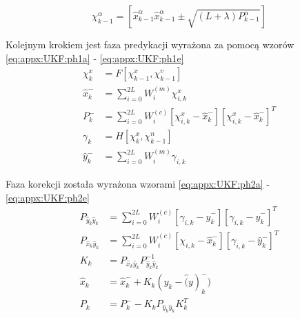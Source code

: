 \begin{equation}
	\chi^\alpha_{k-1} = [\widehat{x}^\alpha_{k-1} \widehat{x}^\alpha_{k-1}\pm\sqrt{(L+\lambda)P^\alpha_{k-1}}] \label{eq:appx:UKF:ph0}
\end{equation}
		
Kolejnym krokiem jest faza predykacji wyrażona za pomocą wzorów \ref{eq:appx:UKF:ph1a} - \ref{eq:appx:UKF:ph1e}
\begin{subequations}
	\begin{align}
		\chi^x_{k}        & = F[\chi^x_{k-1},\chi^v_{k-1}] \label{eq:appx:UKF:ph1a}                                                               \\
		\widehat{x}^-_{k} & = \sum_{i=0}^{2L}W_i^{(m)}\chi^x_{i,k}\label{eq:appx:UKF:ph1b}                                                        \\
		P^-_k             & = \sum_{i=0}^{2L}W_i^{(c)}[\chi^x_{i,k}-\widehat{x}^-_{k}][\chi^x_{i,k}-\widehat{x}^-_{k}]^T \label{eq:appx:UKF:ph1c} \\
		\gamma_k          & = H[\chi^x_k, \chi^n_{k-1}] \label{eq:appx:UKF:ph1d}                                                                  \\
		\widehat{y}^-_{k} & = \sum_{i=0}^{2L}W_i^{(m)}\gamma_{i,k} \label{eq:appx:UKF:ph1e}                                                       
	\end{align}
\end{subequations}
		
Faza korekcji została wyrażona wzorami \ref{eq:appx:UKF:ph2a} - \ref{eq:appx:UKF:ph2e}
\begin{subequations}
	\begin{align}
		P_{\widehat{y}_k\widehat{y}_k} & = \sum_{i=0}^{2L}W_i^{(c)}[\gamma_{i,k} - \widehat{y}^-_k][\gamma_{i,k} - \widehat{y}^-_k]^T\label{eq:appx:UKF:ph2a} \\
		P_{\widehat{x}_k\widehat{y}_k} & = \sum_{i=0}^{2L}W_i^{(c)}[\chi_{i,k} - \widehat{x}^-_k][\gamma_{i,k} - \widehat{y}^-_k]^T\label{eq:appx:UKF:ph2b}   \\
		K_k                            & = P_{\widehat{x}_k\widehat{y}_k} P^{-1}_{\widehat{y}_k\widehat{y}_k} \label{eq:appx:UKF:ph2c}                        \\
		\widehat{x}_k                  & = \widehat{x}^-_{k} + K_k(y_k - \widehat(y)^-_k) \label{eq:appx:UKF:ph2d}                                            \\
		P_k                            & = P^-_k - K_kP_{\widehat{y}_k\widehat{y}_k}K_k^T \label{eq:appx:UKF:ph2e}                                            
	\end{align}
\end{subequations}
		
